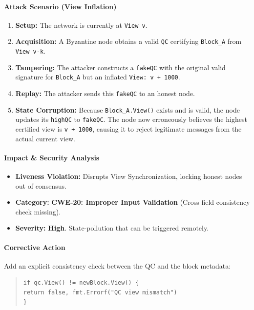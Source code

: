 \documentclass{article}
\theoremstyle{plain}
\theoremstyle{definition}
\theoremstyle{remark}
\begin{document}
{\paragraph{Attack Scenario (View Inflation)}
\begin{enumerate}
    \item \textbf{Setup:} The network is currently at \texttt{View v}.
    \item \textbf{Acquisition:} A Byzantine node obtains a valid \texttt{QC} certifying \texttt{Block\_A} from \texttt{View v-k}.
    \item \textbf{Tampering:} The attacker constructs a \texttt{fakeQC} with the original valid signature for \texttt{Block\_A} but an inflated \texttt{View: v + 1000}.
    \item \textbf{Replay:} The attacker sends this \texttt{fakeQC} to an honest node.
    \item \textbf{State Corruption:} Because \texttt{Block\_A.View()} exists and is valid, the node updates its \texttt{highQC} to \texttt{fakeQC}. The node now erroneously believes the highest certified view is \texttt{v + 1000}, causing it to reject legitimate messages from the actual current view.
\end{enumerate}

\paragraph{Impact \& Security Analysis}
\begin{itemize}
    \item \textbf{Liveness Violation:} Disrupts View Synchronization, locking honest nodes out of consensus.
    \item \textbf{Category:} \textbf{CWE-20: Improper Input Validation} (Cross-field consistency check missing).
    \item \textbf{Severity:} \textbf{High}. State-pollution that can be triggered remotely.
\end{itemize}

\paragraph{Corrective Action}
Add an explicit consistency check between the QC and the block metadata:
\begin{quote}
\texttt{if qc.View() != newBlock.View() \{ \\
\quad return false, fmt.Errorf("QC view mismatch") \\
\}}
\end{quote}
}
\end{document}
